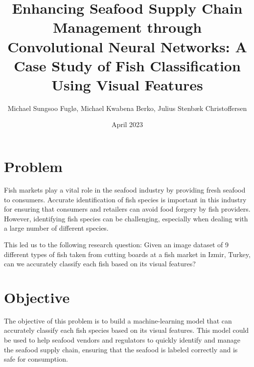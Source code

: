 \documentclass[a4paper, twocolumn]{article}
\author{Michael Sungsoo Fuglø, Michael Kwabena Berko, Julius Stenbæk Christoffersen}
\title{Enhancing Seafood Supply Chain Management through Convolutional Neural Networks: A Case Study of Fish Classification Using Visual Features}
\date{April 2023}
\begin{document}

\section{Problem\label{sec:Problem}}

Fish markets play a vital role in the seafood industry by providing fresh seafood to consumers. Accurate identification of fish species is important in this industry for ensuring that consumers and retailers can avoid food forgery by fish providers. However, identifying fish species can be challenging, especially when dealing with a large number of different species. \cite{10.1371/journal.pone.0012620}

This led us to the following research question:
Given an image dataset of 9 different types of fish taken from cutting boards at a fish market in Izmir, Turkey, can we accurately classify each fish based on its visual features?

\section{Objective\label{sec:Objective}}


The objective of this problem is to build a machine-learning model that can accurately classify each fish species based on its visual features. This model could be used to help seafood vendors and regulators to quickly identify and manage the seafood supply chain, ensuring that the seafood is labeled correctly and is safe for consumption. 
\end{document}
